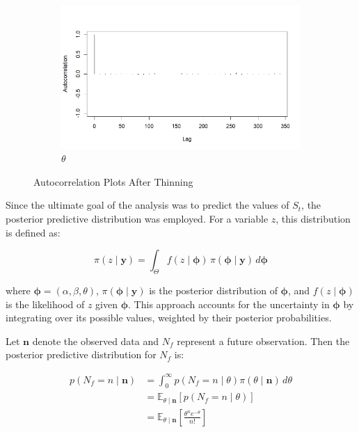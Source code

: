 \documentclass{Class/julia}
\begin{document}
\begin{figure}[!ht]
    \begin{subfigure}{0.45\textwidth}
        \centering
        \includegraphics[width=\textwidth]{rytgaard1990/acf_after_thinning_theta.png}
        \caption{\( \theta \)}
    \end{subfigure}

    \caption{Autocorrelation Plots After Thinning}
    \label{fig:8}
\end{figure}

Since the ultimate goal of the analysis was to predict the values of \( S_t \), the posterior predictive distribution was employed. For a variable \( z \), this distribution is defined as:

\[
\pi(z \mid \mathbf{y}) = \int_{\Theta} f(z \mid \mathbf{\phi}) \, \pi(\mathbf{\phi} \mid \mathbf{y}) \, d\mathbf{\phi}
\]

\noindent where \( \mathbf{\phi} = (\alpha, \beta, \theta) \), \( \pi(\mathbf{\phi} \mid \mathbf{y}) \) is the posterior distribution of \( \mathbf{\phi} \), and \( f(z \mid \mathbf{\phi}) \) is the likelihood of \( z \) given \( \mathbf{\phi} \). This approach accounts for the uncertainty in \( \mathbf{\phi} \) by integrating over its possible values, weighted by their posterior probabilities.

Let \( \mathbf{n} \) denote the observed data and \( N_f \) represent a future observation. Then the posterior predictive distribution for \( N_f \) is:

\[
\begin{aligned}
p (N_f = n \mid \mathbf{n}) 
&= \int_0^{\infty} p(N_f = n \mid \theta) \pi(\theta \mid \mathbf{n}) \, d\theta \\
&= \mathbb{E}_{\theta \mid \mathbf{n}}\left[ p(N_f = n \mid \theta) \right] \\
&= \mathbb{E}_{\theta \mid \mathbf{n}}\left[ \frac{\theta^n e^{-\theta}}{n!} \right]
\end{aligned}
\]
\end{document}

